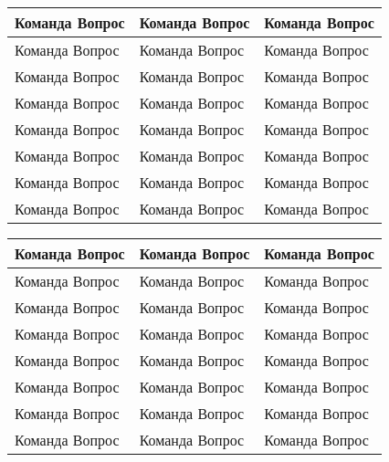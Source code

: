 
\usepackage{multicol}
\usepackage{tabularx}
\newdimen{\blankheight}
\newdimen{\blankwidth}
\newcommand{\cell}{\vspace{-0.5em}\hspace{0.5em} Команда \makebox[2em]{\hrulefill}\hspace{\blankwidth} Вопрос \arabic{Questions}\stepcounter{Questions} \vspace{\blankheight}}

\begin{tabularx}{\textwidth}{>{\raggedright\arraybackslash}X|>{\raggedright\arraybackslash}X|>{\raggedright\arraybackslash}X}
\cell & \cell & \cell \\ \hline
\cell & \cell & \cell \\ \hline
\cell & \cell & \cell \\ \hline
\cell & \cell & \cell \\ \hline
\cell & \cell & \cell \\ \hline
\cell & \cell & \cell \\ \hline
\cell & \cell & \cell \\ \hline
\cell & \cell & \cell \\ \hline
\end{tabularx}
\clearpage
\begin{tabularx}{\textwidth}{>{\raggedright\arraybackslash}X|>{\raggedright\arraybackslash}X|>{\raggedright\arraybackslash}X}
\cell & \cell & \cell \\ \hline
\cell & \cell & \cell \\ \hline
\cell & \cell & \cell \\ \hline
\cell & \cell & \cell \\ \hline
\cell & \cell & \cell \\ \hline
\cell & \cell & \cell \\ \hline
\cell & \cell & \cell \\ \hline
\cell & \cell & \cell \\ \hline
\end{tabularx}

